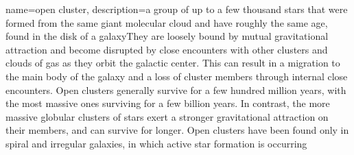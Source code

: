 {
	name={open cluster},
	description={a group of up to a few thousand stars that were formed from the same giant molecular cloud and have roughly the same age, found in the disk of a galaxyThey are loosely bound by mutual gravitational attraction and become disrupted by close encounters with other clusters and clouds of gas as they orbit the galactic center. This can result in a migration to the main body of the galaxy and a loss of cluster members through internal close encounters. Open clusters generally survive for a few hundred million years, with the most massive ones surviving for a few billion years. In contrast, the more massive globular clusters of stars exert a stronger gravitational attraction on their members, and can survive for longer. Open clusters have been found only in spiral and irregular galaxies, in which active star formation is occurring}
}